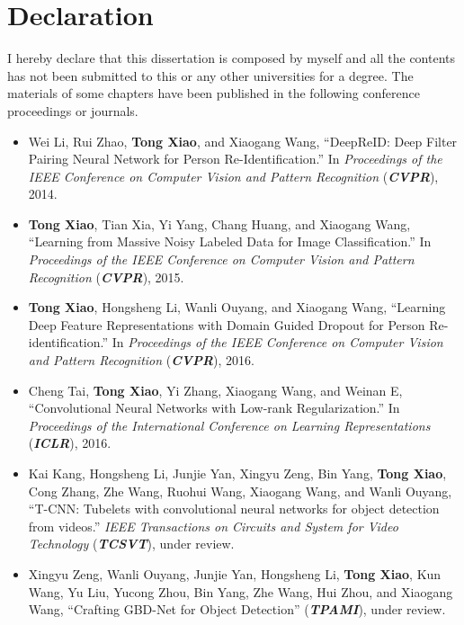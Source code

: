 \chapter*{Declaration}

I hereby declare that this dissertation is composed by myself and all the contents has not been submitted to this or any other universities for a degree. The materials of some chapters have been published in the following conference proceedings or journals.

\begin{itemize}
  \item Wei Li, Rui Zhao, \textbf{Tong Xiao}, and Xiaogang Wang, ``DeepReID: Deep Filter Pairing Neural Network for Person Re-Identification.'' In \textit{Proceedings of the IEEE Conference on Computer Vision and Pattern Recognition} (\textit{\textbf{CVPR}}), 2014.

  \item \textbf{Tong Xiao}, Tian Xia, Yi Yang, Chang Huang, and Xiaogang Wang, ``Learning from Massive Noisy Labeled Data for Image Classification.'' In \textit{Proceedings of the IEEE Conference on Computer Vision and Pattern Recognition} (\textit{\textbf{CVPR}}), 2015.

  \item \textbf{Tong Xiao}, Hongsheng Li, Wanli Ouyang, and Xiaogang Wang, ``Learning Deep Feature Representations with Domain Guided Dropout for Person Re-identification.'' In \textit{Proceedings of the IEEE Conference on Computer Vision and Pattern Recognition} (\textit{\textbf{CVPR}}), 2016.

  \item Cheng Tai, \textbf{Tong Xiao}, Yi Zhang, Xiaogang Wang, and Weinan E, ``Convolutional Neural Networks with Low-rank Regularization.'' In \textit{Proceedings of the International Conference on Learning Representations} (\textit{\textbf{ICLR}}), 2016.

  \item Kai Kang, Hongsheng Li, Junjie Yan, Xingyu Zeng, Bin Yang, \textbf{Tong Xiao}, Cong Zhang, Zhe Wang, Ruohui Wang, Xiaogang Wang, and Wanli Ouyang, ``T-CNN: Tubelets with convolutional neural networks for object detection from videos.'' \textit{IEEE Transactions on Circuits and System for Video Technology} (\textit{\textbf{TCSVT}}), under review.

  \item Xingyu Zeng, Wanli Ouyang, Junjie Yan, Hongsheng Li, \textbf{Tong Xiao}, Kun Wang, Yu Liu, Yucong Zhou, Bin Yang, Zhe Wang, Hui Zhou, and Xiaogang Wang, ``Crafting GBD-Net for Object Detection'' (\textit{\textbf{TPAMI}}), under review.


\end{itemize}
